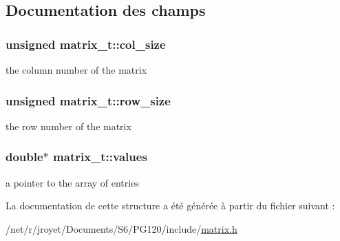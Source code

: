 \subsection{Documentation des champs}
\hypertarget{structmatrix__t_a8927ebbe25fb67a44d54685a2af15de1}{
\subsubsection[{col\-\_\-size}]{\setlength{\rightskip}{0pt plus 5cm}unsigned matrix\-\_\-t\-::col\-\_\-size}}\label{structmatrix__t_a8927ebbe25fb67a44d54685a2af15de1}
the column number of the matrix \hypertarget{structmatrix__t_ad8db0f75faea2e9fb4e0423ca72bb740}{
\subsubsection[{row\-\_\-size}]{\setlength{\rightskip}{0pt plus 5cm}unsigned matrix\-\_\-t\-::row\-\_\-size}}\label{structmatrix__t_ad8db0f75faea2e9fb4e0423ca72bb740}
the row number of the matrix \hypertarget{structmatrix__t_adc159eec6e4a7f7e6a76363cfd1e62fe}{
\subsubsection[{values}]{\setlength{\rightskip}{0pt plus 5cm}double$\ast$ matrix\-\_\-t\-::values}}\label{structmatrix__t_adc159eec6e4a7f7e6a76363cfd1e62fe}
a pointer to the array of entries 

La documentation de cette structure a été générée à partir du fichier suivant \-:\begin{DoxyCompactItemize}
\item 
/net/r/jroyet/\-Documents/\-S6/\-P\-G120/include/\hyperlink{matrix_8h}{matrix.\-h}\end{DoxyCompactItemize}
